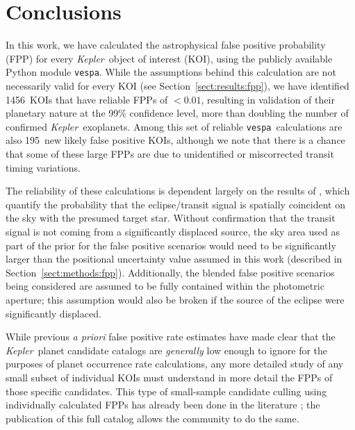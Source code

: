 \documentclass{emulateapj}
\newcommand{\sectionname}{Section}
\newcommand{\Sect}[1]{\sectionname~\ref{sect:#1}}
\newcommand{\sect}[1]{\Sect{#1}}
\newcommand{\sectlabel}[1]{\label{sect:#1}}
\newcommand{\nvalnew}{1456}
\newcommand{\nfpnew}{195}
\newcommand{\kepler}{\textit{Kepler}}
\newcommand{\vespa}{\texttt{vespa}}
\begin{document}

\section{Conclusions}
\sectlabel{conclusions}

In this work, we have calculated the astrophysical false positive
probability (FPP) for every \kepler\ object of interest (KOI), using
the publicly available Python module \vespa.  While the assumptions
behind this calculation are not necessarily valid for every KOI (see
\sect{results:fpp}), we have identified \nvalnew\ KOIs that have
reliable FPPs of $< 0.01$, resulting in validation of their planetary
nature at the 99\% confidence level, more than doubling the number of
confirmed \kepler\ exoplanets.  Among this set of reliable \vespa\
calculations are also \nfpnew\ new likely false positive KOIs,
although we note that there is a chance that some of these large FPPs
are due to unidentified or miscorrected transit timing variations.

The reliability of these calculations is dependent largely on the
results of \citet{Bryson:KSCI}, which quantify the probability that
the eclipse/transit signal is spatially coincident on the sky with the
presumed target star.  Without confirmation that the transit signal is
not coming from a significantly displaced source, the sky area used as
part of the prior for the false positive scenarios would need to be
significantly larger than the positional uncertainty value assumed in
this work (described in \sect{methods:fpp}).  Additionally, the
blended false positive scenarios being considered are assumed to be
fully contained within the photometric aperture; this assumption would
also be broken if the source of the eclipse were significantly
displaced. 

While previous \emph{a priori} false positive rate estimates
\cite{Morton:2011b,Fressin:2013} have made clear that the
\kepler\ planet candidate catalogs are \emph{generally} low enough to
ignore for the purposes of planet occurrence rate calculations, any
more detailed study of any small subset of individual KOIs must
understand in more detail the FPPs of those specific candidates.  This
type of small-sample candidate culling using individually calculated
FPPs has already been done in the literature
\citep{MortonSwift:2014,MortonWinn:2015}; the publication of this full
catalog allows the community to do the same.
\end{document}
